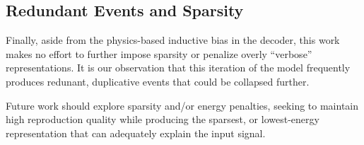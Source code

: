 \documentclass[9pt,conference]{IEEEtran}
\begin{document}
\subsection{Redundant Events and Sparsity}
\label{ssec:decoder_variants}

Finally, aside from the physics-based inductive bias in the decoder, this work
makes no effort to further impose sparsity or penalize overly ``verbose'' representations.
It is our observation that this iteration of the model frequently produces redunant, 
duplicative events that could be collapsed further.

Future work should explore sparsity and/or energy penalties, seeking to maintain high 
reproduction quality while producing the sparsest, or lowest-energy representation
that can adequately explain the input signal.




\clearpage








\end{document}
